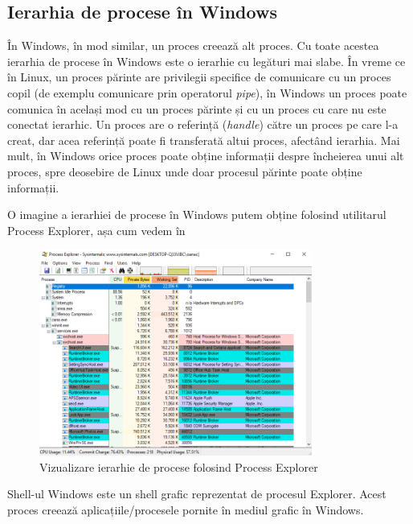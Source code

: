 \subsection{Ierarhia de procese în Windows}
\label{sec:procese-ierarhie-windows}

În Windows, în mod similar, un proces creează alt proces. Cu toate acestea
ierarhia de procese în Windows este o ierarhie cu legături mai slabe. În vreme
ce în Linux, un proces părinte are privilegii specifice de comunicare cu un
proces copil (de exemplu comunicare prin operatorul \textit{pipe}), în Windows un proces poate comunica în
același mod cu un proces părinte și cu un proces cu care nu este conectat
ierarhic. Un proces are o referință (\textit{handle}) către un proces pe care l-a creat, dar acea referință poate fi transferată altui proces, afectând ierarhia. Mai mult, în Windows orice proces poate obține informații despre
încheierea unui alt proces, spre deosebire de Linux unde doar procesul părinte
poate obține informații.

O imagine a ierarhiei de procese în Windows putem obține folosind utilitarul
Process Explorer, așa cum vedem în 

\begin{figure}[!htbp]
	\centering
	\includegraphics[width=0.8\textwidth]{chapters/04-process/img/process-explorer.png}
	\caption{Vizualizare ierarhie de procese folosind Process Explorer}
	\label{fig:process-process-explorer-hierarchy}
\end{figure}

Shell-ul Windows este un shell grafic reprezentat de procesul Explorer. Acest
proces creează aplicațiile/procesele pornite în mediul grafic în Windows.


